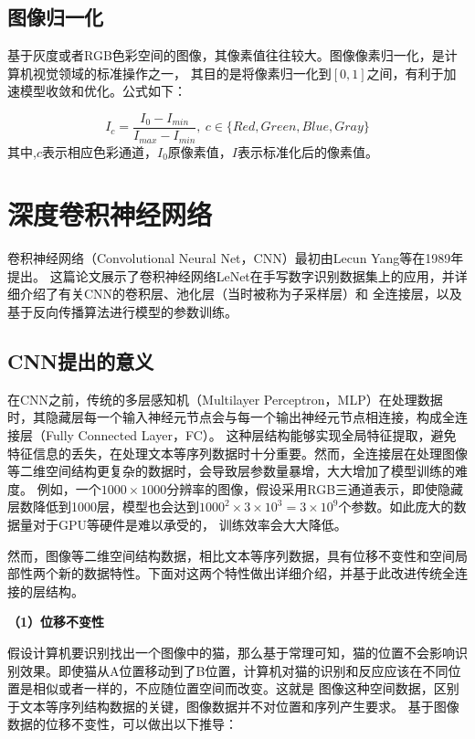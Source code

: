 \subsection{图像归一化}
基于灰度或者RGB色彩空间的图像，其像素值往往较大。图像像素归一化，是计算机视觉领域的标准操作之一，
其目的是将像素归一化到$[0,1]$之间，有利于加速模型收敛和优化。公式如下：

\begin{equation}
	I_c = \frac{I_0-I_{min}}{I_{max}-I_{min}},\ c\in {\{Red,Green,Blue,Gray\}}
\end{equation}
其中,$c$表示相应色彩通道，$I_0$原像素值，$I$表示标准化后的像素值。

\section{深度卷积神经网络}
卷积神经网络（Convolutional Neural Net，CNN）最初由Lecun Yang等在1989年提出。
这篇论文展示了卷积神经网络LeNet在手写数字识别数据集上的应用，并详细介绍了有关CNN的卷积层、池化层（当时被称为子采样层）和
全连接层，以及基于反向传播算法进行模型的参数训练。

\subsection{CNN提出的意义}
在CNN之前，传统的多层感知机（Multilayer Perceptron，MLP）在处理数据时，其隐藏层每一个输入神经元节点会与每一个输出神经元节点相连接，构成全连接层（Fully Connected Layer，FC）。
这种层结构能够实现全局特征提取，避免特征信息的丢失，在处理文本等序列数据时十分重要。然而，全连接层在处理图像等二维空间结构更复杂的数据时，会导致层参数量暴增，大大增加了模型训练的难度。
例如，一个$1000\times1000$分辨率的图像，假设采用RGB三通道表示，即使隐藏层数降低到1000层，模型也会达到$1000^2\times3\times10^3=3\times10^9$个参数。如此庞大的数据量对于GPU等硬件是难以承受的，
训练效率会大大降低。

然而，图像等二维空间结构数据，相比文本等序列数据，具有位移不变性和空间局部性两个新的数据特性。下面对这两个特性做出详细介绍，并基于此改进传统全连接的层结构。

\textbf{（1）位移不变性}

假设计算机要识别找出一个图像中的猫，那么基于常理可知，猫的位置不会影响识别效果。即使猫从A位置移动到了B位置，计算机对猫的识别和反应应该在不同位置是相似或者一样的，不应随位置空间而改变。这就是
图像这种空间数据，区别于文本等序列结构数据的关键，图像数据并不对位置和序列产生要求。
基于图像数据的位移不变性，可以做出以下推导：

